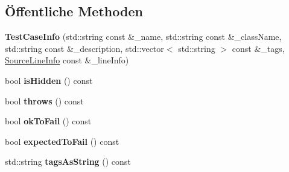 \subsection*{Öffentliche Methoden}
\begin{DoxyCompactItemize}
\item 
\mbox{\label{structCatch_1_1TestCaseInfo_ad1a6b08b5a83d1c5eb4596b727b5305f}} 
{\bfseries Test\+Case\+Info} (std\+::string const \&\+\_\+name, std\+::string const \&\+\_\+class\+Name, std\+::string const \&\+\_\+description, std\+::vector$<$ std\+::string $>$ const \&\+\_\+tags, \hyperlink{structCatch_1_1SourceLineInfo}{Source\+Line\+Info} const \&\+\_\+line\+Info)
\item 
\mbox{\label{structCatch_1_1TestCaseInfo_a934b1a0952700743e99d62ec1731a2e2}} 
bool {\bfseries is\+Hidden} () const
\item 
\mbox{\label{structCatch_1_1TestCaseInfo_afc70d4379a2070cc22b693ffe3932c1a}} 
bool {\bfseries throws} () const
\item 
\mbox{\label{structCatch_1_1TestCaseInfo_a5f37291295e3a6de2dd85324c941edaf}} 
bool {\bfseries ok\+To\+Fail} () const
\item 
\mbox{\label{structCatch_1_1TestCaseInfo_abe33d81233230cdae8afa714688e905b}} 
bool {\bfseries expected\+To\+Fail} () const
\item 
\mbox{\label{structCatch_1_1TestCaseInfo_a17506de67fb18e27511c17f8a81119d8}} 
std\+::string {\bfseries tags\+As\+String} () const
\end{DoxyCompactItemize}
